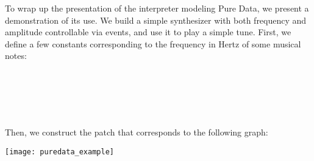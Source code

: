 
To wrap up the presentation of the interpreter modeling Pure Data, we present
a demonstration of its use. We build a simple synthesizer with both frequency
and amplitude controllable via events, and use it to play a simple tune.
First, we define a few constants corresponding to the frequency in Hertz of
some musical notes:

\begin{hscode}\SaveRestoreHook
{}%
%
%
\>[B]{}\<[9]%
\>[9]{}\mathrel{=}\<[E]%
\\
\>[B]{}\<[9]%
\>[9]{}\mathrel{=}\<[E]%
\\
\>[B]{}\<[9]%
\>[9]{}\mathrel{=}\<[E]%
\\
\>[B]{}\<[9]%
\>[9]{}\mathrel{=}\<[E]%
\\
\>[B]{}\<[9]%
\>[9]{}\mathrel{=}\<[E]%
\ColumnHook
\end{hscode}\resethooks

Then, we construct the patch that corresponds to the following graph:

\begin{center}
\texttt{[image: puredata\_example]}
\par\end{center}

